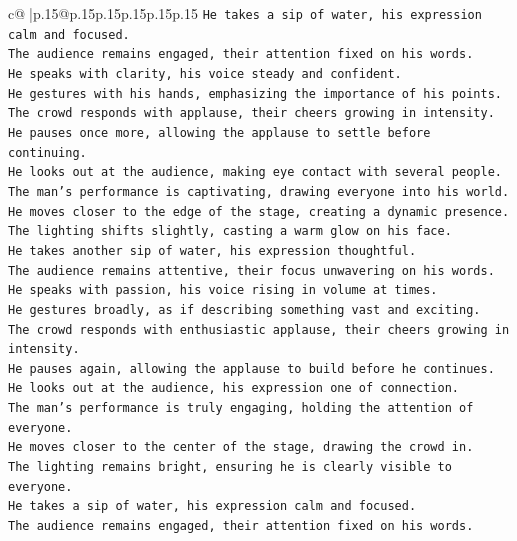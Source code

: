 \documentclass{article}
\begin{document}
{\begin{supertabular}{c@{$\;$}|p{.15\linewidth}@{}p{.15\linewidth}p{.15\linewidth}p{.15\linewidth}p{.15\linewidth}p{.15\linewidth}}
{{{\texttt{He takes a sip of water, his expression calm and focused.  } \\
\texttt{The audience remains engaged, their attention fixed on his words.  } \\
\texttt{He speaks with clarity, his voice steady and confident.  } \\
\texttt{He gestures with his hands, emphasizing the importance of his points.  } \\
\texttt{The crowd responds with applause, their cheers growing in intensity.  } \\
\texttt{He pauses once more, allowing the applause to settle before continuing.  } \\
\texttt{He looks out at the audience, making eye contact with several people.  } \\
\texttt{The man's performance is captivating, drawing everyone into his world.  } \\
\texttt{He moves closer to the edge of the stage, creating a dynamic presence.  } \\
\texttt{The lighting shifts slightly, casting a warm glow on his face.  } \\
\texttt{He takes another sip of water, his expression thoughtful.  } \\
\texttt{The audience remains attentive, their focus unwavering on his words.  } \\
\texttt{He speaks with passion, his voice rising in volume at times.  } \\
\texttt{He gestures broadly, as if describing something vast and exciting.  } \\
\texttt{The crowd responds with enthusiastic applause, their cheers growing in intensity.  } \\
\texttt{He pauses again, allowing the applause to build before he continues.  } \\
\texttt{He looks out at the audience, his expression one of connection.  } \\
\texttt{The man's performance is truly engaging, holding the attention of everyone.  } \\
\texttt{He moves closer to the center of the stage, drawing the crowd in.  } \\
\texttt{The lighting remains bright, ensuring he is clearly visible to everyone.  } \\
\texttt{He takes a sip of water, his expression calm and focused.  } \\
\texttt{The audience remains engaged, their attention fixed on his words.  } \\
}}}
\end{supertabular}}
\end{document}
